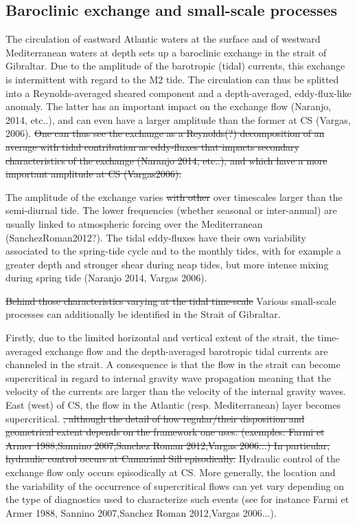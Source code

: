 \subsection{Baroclinic exchange and small-scale processes}


The circulation of eastward Atlantic waters at the surface and of westward Mediterranean waters at depth sets up a baroclinic exchange in the strait of Gibraltar. Due to the amplitude of the barotropic \color{blue}(tidal) currents, this exchange is \color{black} intermittent with regard to the M2 tide. \color{blue}The circulation can thus be splitted into a Reynolds-averaged sheared component and a depth-averaged, eddy-flux-like anomaly. The latter has an important impact on the exchange flow (Naranjo, 2014, etc..), and can even have a larger amplitude than the former at CS (Vargas, 2006). \color{black}
\sout{One can thus see the exchange as a Reynolds(?) decomposition of an average with tidal contribution as eddy-fluxes that impacts secondary characteristics of the exchange (Naranjo 2014, etc..), and which have a more important amplitude at CS (Vargas2006).}  

\color{blue}The amplitude of the exchange varies \sout{with other} over timescales larger than the semi-diurnal tide. The lower frequencies (whether seasonal or inter-annual) are usually linked to atmospheric forcing over the Mediterranean (SanchezRoman2012?). \color{black} The tidal eddy-fluxes have their own variability associated to the spring-tide cycle and to the monthly tides, with for example a greater depth and stronger shear during neap tides, but more intense mixing during spring tide (Naranjo 2014, Vargas 2006).

\sout{Behind those characteristics varying at the tidal time-scale} \color{blue}Various small-scale processes can additionally be identified in the Strait of Gibraltar. \color{black}

Firstly, due to the limited horizontal and vertical extent of the strait, \color{blue} the time-averaged exchange flow and the depth-averaged barotropic tidal currents are channeled in the strait. \color{black} A consequence is that the flow in the strait can become supercritical in regard to internal gravity wave propagation \color{blue} meaning that the velocity of the currents are larger than the velocity of the internal gravity waves. \color{black} East (west) of CS, the flow in the Atlantic (resp. Mediterranean) layer becomes supercritical.
\sout{, although the detail of how regular/their disposition and geometrical extent depends on the framework one uses. (exemples: Farmi et Armer 1988,Sannino 2007,Sanchez Roman 2012,Vargas 2006...) In particular, hydraulic control occurs at Camarinal Sill episodically.}
\color{blue} Hydraulic control of the exchange flow only occurs episodically at CS. More generally, the location and the variability of the occurrence of supercritical flows can yet vary depending on the type of diagnostics used to characterize such events (see for instance Farmi et Armer 1988, Sannino 2007,Sanchez Roman 2012,Vargas 2006...). \color{black}

